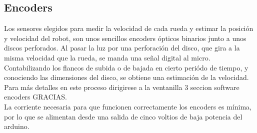 \subsection{Encoders}
Los sensores elegidos para medir la velocidad de cada rueda y estimar la posición y velocidad del robot, son unos sencillos encoders ópticos binarios junto a unos discos perforados. Al pasar la luz por una perforación del disco, que gira a la misma velocidad que la rueda, se manda una señal digital al micro. Contabilizando los flancos de subida o de bajada en cierto periódo de tiempo, y conociendo las dimensiones del disco, se obtiene una estimación de la velocidad. Para más detalles en este proceso dirigirese a la ventanilla 3 seccion software encoders GRACIAS. \\
La corriente necesaria para que funcionen correctamente los encoders es mínima, por lo que se alimentan desde una salida de cinco voltios de baja potencia del arduino.
